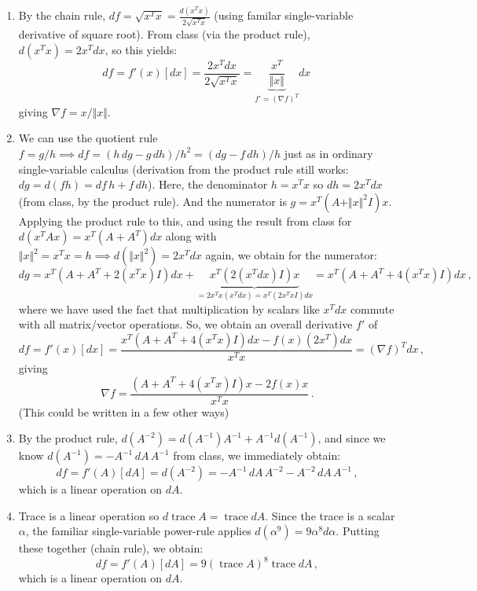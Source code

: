 \documentclass[10pt,oneside]{article}
\newcommand{\tr}{\operatorname{trace}}
\begin{document}
\begin{enumerate}
\item By the chain rule, $df = \sqrt{x^T x} = \frac{d(x^T x)}{2\sqrt{x^T x}}$ (using familar single-variable derivative of square root).  From class (via the product rule), $d(x^T x) = 2x^T dx$, so this yields:
$$
df = f'(x)[dx] = \frac{2 x^T dx}{2\sqrt{x^T x}} = \underbrace{\frac{x^T}{\Vert x \Vert}}_{f' = (\nabla f)^T} dx \,
$$
giving $\boxed{\nabla f = x / \Vert x \Vert}$.

\item We can use the quotient rule $f = g/h \implies df = (h \, dg - g\, dh) / h^2 = (dg - f\, dh)/h$ just as in ordinary single-variable calculus (derivation from the product rule still works: $dg = d(fh) = df \, h + f\, dh$).  Here, the denominator $h = x^T x$ so $dh = 2x^T dx$ (from class, by the product rule).  And the numerator is $g = x^T (A + \Vert x \Vert^2 I) x$.  Applying the product rule to this, and using the result from class for $d(x^T A x) = x^T (A + A^T)dx$ along with $\Vert x \Vert^2 = x^T x = h \implies d(\Vert x \Vert^2) = 2x^T dx$ again, we obtain for the numerator:
$$
dg = x^T \left(A + A^T + 2 (x^T x) I\right) dx + \underbrace{x^T (2 (x^T dx) I) x}_{= 2 x^T x (x^T dx) = x^T ( 2x^T x I) dx} = x^T \left(A + A^T + 4 (x^T x) I\right) dx \, ,
$$
where we have used the fact that multiplication by scalars like $x^T dx$ commute with all matrix/vector operations.  So, we obtain an overall derivative $f'$ of
$$
df=f'(x)[dx] = \frac{x^T \left(A + A^T + 4 (x^T x) I\right) dx - f(x) (2x^T) dx}{x^T x} = (\nabla f)^T dx \, ,
$$
giving
\begin{equation}
\boxed{\nabla f = \frac{ \left(A + A^T + 4 (x^T x) I\right) x  - 2f(x) x}{x^T x}} \, .
\end{equation}
(This could be written in a few other ways)

\item By the product rule, $d(A^{-2}) = d(A^{-1})A^{-1} + A^{-1} d(A^{-1})$, and since we know $d(A^{-1}) = - A^{-1}\, dA \, A^{-1}$ from class, we immediately obtain:
$$
df = f'(A)[dA] = d(A^{-2}) =  \boxed{- A^{-1}\, dA \, A^{-2} - A^{-2}\, dA \, A^{-1} } \, ,
$$
which is a linear operation on $dA$.

\item Trace is a linear operation so $d \tr A = \tr dA$.  Since the trace is a scalar $\alpha$, the familiar single-variable power-rule applies $d(\alpha^9) = 9 \alpha^8 d\alpha$.  Putting these together (chain rule), we obtain:
$$
df = f'(A)[dA] = \boxed{9 (\tr A)^8 \tr dA }\, ,
$$
which is a linear operation on $dA$.


\end{enumerate}
\end{document}
